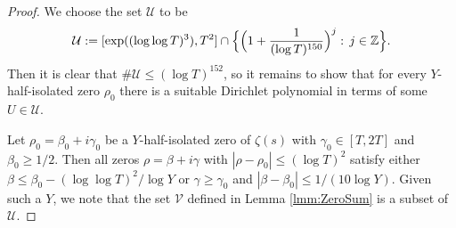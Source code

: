 \documentclass[12pt]{amsart}
\theoremstyle{plain}
\theoremstyle{definition}
\theoremstyle{remark}
\begin{document}
\begin{proof}
We choose the set $\mathcal{U}$ to be
\[
\mathcal{U}:=[\exp((\log\log{T})^3),T^2]\cap\Bigl\{\Bigl(1+\frac{1}{(\log{T})^{150}}\Bigr)^j:\,j\in\mathbb{Z}\Bigr\}.
\]
Then it is clear that $\#\mathcal{U}\le (\log{T})^{152}$, so it remains to show that for every $Y$-half-isolated zero $\rho_0$ there is a suitable Dirichlet polynomial in terms of some $U\in\mathcal{U}$.

 Let $\rho_0=\beta_0+i\gamma_0$ be a $Y$-half-isolated zero of $\zeta(s)$ with $\gamma_0\in [T,2T]$ and $\beta_0\ge 1/2$. Then all zeros $\rho=\beta+i\gamma$ with $|\rho-\rho_0|\le (\log{T})^2$ satisfy either $\beta\le \beta_0-(\log\log{T})^2/\log{Y}$ or $\gamma\ge \gamma_0$ and $|\beta-\beta_0|\le 1/(10\log{Y})$. Given such a $Y$, we note that the set $\mathcal{V}$ defined in Lemma \ref{lmm:ZeroSum} is a subset of $\mathcal{U}$.


\end{proof}
\end{document}

